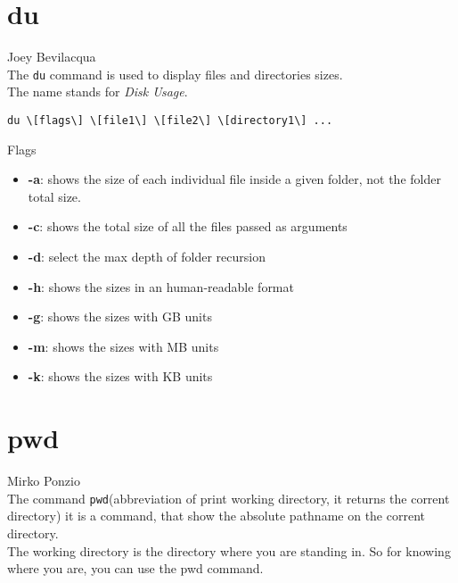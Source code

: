 \documentclass[hidelinks,12pt,a4paper,numbers=enddot]{scrartcl}
\begin{document}
\section{du}


\large Joey Bevilacqua \normalsize\\



The \texttt{du} command is used to display files and directories sizes.\\
The name stands for \emph{Disk Usage}.

\begin{verbatim}
du \[flags\] \[file1\] \[file2\] \[directory1\] ...
\end{verbatim}

Flags

\begin{itemize}
    \item \textbf{-a}: shows the size of each individual file inside a given folder,
        not the folder total size.
    
    \item \textbf{-c}: shows the total size of all the files passed as arguments
    \item \textbf{-d}: select the max depth of folder recursion
    \item \textbf{-h}: shows the sizes in an human-readable format
    \item \textbf{-g}: shows the sizes with GB units
    \item \textbf{-m}: shows the sizes with MB units
    \item \textbf{-k}: shows the sizes with KB units
\end{itemize}

\section{pwd}


\large Mirko Ponzio \normalsize\\





The command \texttt{pwd}(abbreviation of print working directory, it returns the
corrent directory) it is a command, that show the absolute pathname on the corrent directory.\\

The working directory is the directory where you are standing in. So for
knowing where you are, you can use the pwd command.\\
\end{document}
